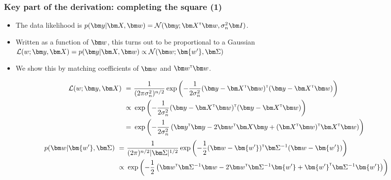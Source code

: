 





\begin{frame}
\frametitle{Key part of the derivation: completing the square (1)}
%
\vspace*{-0.1cm}
\begin{itemize}
  \item The data likelihood is $p(\by | \bX, \bw) = \norm(\by; \bX\transpose{}\bw, \sigma^2_n \bI)$.
  \item Written as a function of $\bw$, this turns out to be proportional to a Gaussian $\mathcal{L}(w; \by, \bX) = p(\by | \bX, \bw) \propto \norm( \bw; \bm{w'}, \bSigma )$
  \item We show this by matching coefficients of $\bw$ and $\bw\transpose \bw$.
\end{itemize}
\pause
%
\vspace*{-0.2cm}
%
\begin{align*}
\mathcal{L}(w; \by, \bX)~=~& \frac{1}{(2\pi\sigma^2_n)^{n/2}} \exp \left(-\frac{1}{2 \sigma^2_n} (\by-\bX\transpose\bw)\transpose (\by-\bX\transpose\bw) \right) \\
                         \propto~& \exp \left(-\frac{1}{2 \sigma^2_n} (\by-\bX\transpose\bw)\transpose (\by-\bX\transpose\bw) \right) \\
                         =~& \exp \left(-\frac{1}{2 \sigma^2_n} \left(\by\transpose\by - 2 \bw\transpose\bX\by + (\bX\transpose\bw)\transpose \bX\transpose\bw \right) \right)
\end{align*}
%
\vspace*{-0.5cm}
%
\pause
\begin{align*}
p(\bw | \bm{w'}, \bSigma)~=~& \frac{1}{(2\pi)^{n/2}|\bSigma|^{1/2}} \exp \left(-\frac{1}{2} (\bw-\bm{w'})\transpose \bSigma^{-1} (\bw-\bm{w'}) \right) \\
\propto~& \exp \left( -\frac{1}{2} \left( \bw \transpose \bSigma\inv \bw -2 \bw\transpose \bSigma\inv \bm{w'} + {\bm{w'}}\transpose \bSigma\inv \bm{w'} \right) \right)
\end{align*}
%
\vspace*{-0.3cm}
%
\end{frame}

